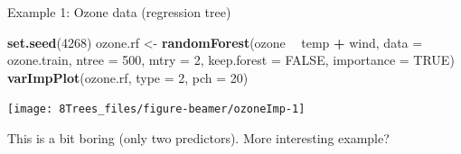 \documentclass[10pt,ignorenonframetext,]{beamer}
\newenvironment{Shaded}{\begin{snugshade}}{\end{snugshade}}
\newcommand{\KeywordTok}[1]{\textcolor[rgb]{0.13,0.29,0.53}{\textbf{#1}}}
\newcommand{\DataTypeTok}[1]{\textcolor[rgb]{0.13,0.29,0.53}{#1}}
\newcommand{\DecValTok}[1]{\textcolor[rgb]{0.00,0.00,0.81}{#1}}
\newcommand{\StringTok}[1]{\textcolor[rgb]{0.31,0.60,0.02}{#1}}
\newcommand{\OtherTok}[1]{\textcolor[rgb]{0.56,0.35,0.01}{#1}}
\newcommand{\OperatorTok}[1]{\textcolor[rgb]{0.81,0.36,0.00}{\textbf{#1}}}
\newcommand{\NormalTok}[1]{#1}
\begin{document}
\begin{frame}[fragile]

\begin{block}{Example 1: Ozone data (regression tree)}

\scriptsize

\begin{Shaded}
\begin{Highlighting}[]
\KeywordTok{set.seed}\NormalTok{(}\DecValTok{4268}\NormalTok{)}
\NormalTok{ozone.rf <-}\StringTok{ }\KeywordTok{randomForest}\NormalTok{(ozone }\OperatorTok{~}\StringTok{ }\NormalTok{temp }\OperatorTok{+}\StringTok{ }\NormalTok{wind, }\DataTypeTok{data =}\NormalTok{ ozone.train, }\DataTypeTok{ntree =} \DecValTok{500}\NormalTok{, }
    \DataTypeTok{mtry =} \DecValTok{2}\NormalTok{, }\DataTypeTok{keep.forest =} \OtherTok{FALSE}\NormalTok{, }\DataTypeTok{importance =} \OtherTok{TRUE}\NormalTok{)}
\KeywordTok{varImpPlot}\NormalTok{(ozone.rf, }\DataTypeTok{type =} \DecValTok{2}\NormalTok{, }\DataTypeTok{pch =} \DecValTok{20}\NormalTok{)}
\end{Highlighting}
\end{Shaded}

\begin{center}\texttt{[image: 8Trees\_files/figure-beamer/ozoneImp-1]} \end{center}

\normalsize
This is a bit boring (only two predictors). More interesting example?

\end{block}

\end{frame}
\end{document}
